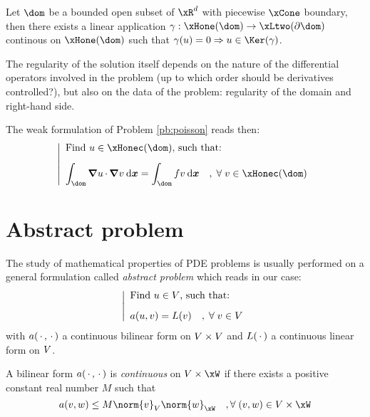 \begin{lmm}
Let $\dom$ be a bounded open subset of $\xR^d$ with piecewise $\xCone$ boundary, then there exists a linear application $\gamma : \xHone(\dom) \fromto \xLtwo(\partial\dom)$ continous on $\xHone(\dom)$ such that $\gamma(u) = 0 \Rightarrow u \in \Ker(\gamma)$.
\end{lmm}

The regularity of the solution itself depends on the nature of the differential operators involved in the problem (\eg up to which order should be derivatives controlled?), but also on the data of the problem: regularity of the domain and right-hand side.

\medskip
The weak formulation of Problem \eqref{pb:poisson} reads then:
\begin{equation}\label{pb:weak_poissonHone}
\left\lvert
\begin{array}{ll}
\mbox{Find $u \in \xHonec(\dom)$, such that:}\\[2ex]
\displaystyle\int_\dom \Grad u\xDot \Grad v\dxx = \int_\dom f v  \dxx\quad,\;\forany  v\in \xHonec(\dom)
\end{array}
\right .
\end{equation}

\section{Abstract problem}

The study of mathematical properties of PDE problems is usually performed on a general formulation called \textit{abstract problem} which reads in our case:
\begin{equation}\label{pb:abstract}
\left\lvert
\begin{array}{ll}
\mbox{Find $u \in {V}$, such that:}\\[2ex]
\displaystyle a( u, v ) = L(v)\quad,\;{\forall\;}  v\in {V}
\end{array}
\right .
\end{equation}
with $a(\,{\mathbf\cdot}\,,\,{\mathbf\cdot}\,)$ a continuous bilinear form on ${V}\times{V}$ and $L(\,{\mathbf\cdot}\,)$ a continuous linear form on ${V}$.

\begin{prpstn}[Continuity]
A bilinear form $a(\,{\mathbf\cdot}\,,\,{\mathbf\cdot}\,)$ is \textit{continuous} on $\xV\times\xW$ if there exists a positive constant real number $M$ such that
\begin{equation*}
a( v, w ) \leq M \norm{v}_\xV \norm{w}_\xW\quad,\forany (v,w)\in \xV\times\xW
\end{equation*}
\end{prpstn}

